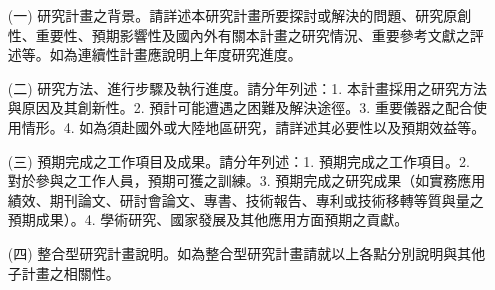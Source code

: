 \documentclass[12pt,a4paper]{article}
\begin{document}

\begin{enumerate}
\item[(一)] 研究計畫之背景。請詳述本研究計畫所要探討或解決的問題、研究原創性、重要性、預期影響性及國內外有關本計畫之研究情況、重要參考文獻之評述等。如為連續性計畫應說明上年度研究進度。
\item[(二)] 研究方法、進行步驟及執行進度。請分年列述：1. 本計畫採用之研究方法與原因及其創新性。2. 預計可能遭遇之困難及解決途徑。3. 重要儀器之配合使用情形。4. 如為須赴國外或大陸地區研究，請詳述其必要性以及預期效益等。
\item[(三)] 預期完成之工作項目及成果。請分年列述：1. 預期完成之工作項目。2. 對於參與之工作人員，預期可獲之訓練。3. 預期完成之研究成果（如實務應用績效、期刊論文、研討會論文、專書、技術報告、專利或技術移轉等質與量之預期成果）。4. 學術研究、國家發展及其他應用方面預期之貢獻。
\item[(四)] 整合型研究計畫說明。如為整合型研究計畫請就以上各點分別說明與其他子計畫之相關性。
\end{enumerate}	

\label{LastPage}
\end{document}
